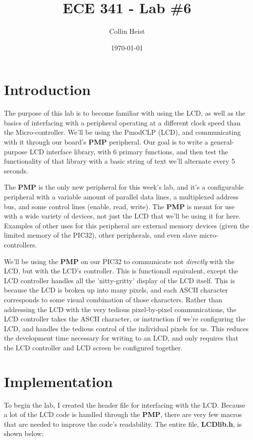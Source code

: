 \documentclass[a4paper, 12pt]{article}
\begin{document}
\title{ECE 341 - Lab \#6}
\author{Collin Heist}
\date{\today}
\maketitle
{}
\tableofcontents
\lstlistoflistings
\newpage
{}

\section{Introduction}
The purpose of this lab is to become familiar with using the LCD, as well as the basics of interfacing with a peripheral operating at a different clock speed than the Micro-controller. We'll be using the PmodCLP (LCD), and communicating with it through our board's \textbf{PMP} peripheral. Our goal is to write a general-purpose LCD interface library, with 6 primary functions, and then test the functionality of that library with a basic string of text we'll alternate every 5 seconds.

The \textbf{PMP} is the only new peripheral for this week's lab, and it's a configurable peripheral with a variable amount of parallel data lines, a multiplexed address bus, and some control lines (enable, read, write). The \textbf{PMP} is meant for use with a wide variety of devices, not just the LCD that we'll be using it for here. Examples of other uses for this peripheral are external memory devices (given the limited memory of the PIC32), other peripherals, and even slave micro-controllers. 

We'll be using the \textbf{PMP} on our PIC32 to communicate not \textit{directly} with the LCD, but with the LCD's controller. This is functionall equivalent, except the LCD controller handles all the 'nitty-gritty' display of the LCD itself. This is because the LCD is broken up into many pixels, and each ASCII character corresponds to some visual combination of those characters. Rather than addressing the LCD with the very tedious pixel-by-pixel communications, the LCD controller takes the ASCII character, or instruction if we're configuring the LCD, and handles the tedious control of the individual pixels for us. This reduces the development time necessary for writing to an LCD, and only requires that the LCD controller and LCD screen be configured together.

\section{Implementation}
To begin the lab, I created the header file for interfacing with the LCD. Because a lot of the LCD code is handled through the \textbf{PMP}, there are very few macros that are needed to improve the code's readability. The entire file, \textbf{LCDlib.h}, is shown below:
\end{document}
